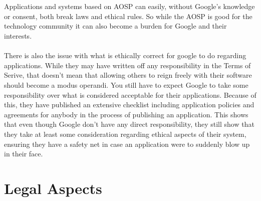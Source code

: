 \documentclass[conference]{IEEEtran}
\begin{document}
\\\\Applications and systems based on AOSP can easily, without Google's knowledge or consent, both break laws and ethical rules. So while the AOSP is good for the technology community it can also become a burden for Google and their interests.
\\\\There is also the issue with what is ethically correct for google to do regarding applications. While they may have written off any responsibility in the Terms of Serive, that doesn't mean that allowing others to reign freely with their software should become a modus operandi. You still have to expect Google to take some responsibility over what is considered acceptable for their applications. Because of this, they have published an extensive checklist including application policies and agreements for anybody in the process of publishing an application.\cite{app-publishing} This shows that even though Google don't have any direct responsibility, they still show that they take at least some consideration regarding ethical aspects of their system, ensuring they have a safety net in case an application were to suddenly blow up in their face. 


\section{Legal Aspects}
\label{legal}
\end{document}
